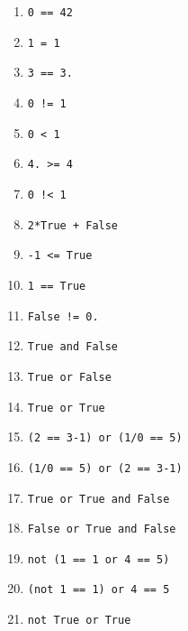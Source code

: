 \exer{}
\setcounter{numques}{0}


\begin{multicols}{2}
  \begin{enumerate}[label=\emph{\alph*)}]
    \item \texttt{0 == 42}
    \item \texttt{1 = 1}
    \item \texttt{3 == 3.}
    \item \texttt{0 != 1}
    \item \texttt{0 < 1}
    \item \texttt{4. >= 4}
    \item \texttt{0 !< 1}
    \item \texttt{2*True + False}
    \item \texttt{-1 <= True}
    \item \texttt{1 == True}
    \item \texttt{False != 0.}
    \item \texttt{True and False}
    \item \texttt{True or False}
    \item \texttt{True or True}
  \end{enumerate}
   


\end{multicols}
 \begin{enumerate}[label=\emph{\alph*)}]
    \setcounter{enumi}{14}
    \item \texttt{(2 == 3-1) or (1/0 == 5)}
    \item \texttt{(1/0 == 5) or (2 == 3-1)}
    \item \texttt{True or True and False}
    \item \texttt{False or True and False}    
    \item \texttt{not (1 == 1 or 4 == 5)}
    \item \texttt{(not 1 == 1) or 4 == 5}
    \item \texttt{not True or True}
  \end{enumerate}